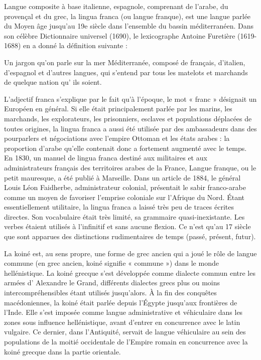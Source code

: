 Langue composite à base italienne, espagnole, comprenant de l’arabe, du provençal et du grec, la lingua franca (ou langue franque), est une langue parlée du Moyen âge jusqu’au 19e siècle dans l’ensemble du bassin méditerranéen. Dans son célèbre Dictionnaire universel (1690), le lexicographe Antoine Furetière (1619-1688) en a donné la définition suivante :


Un jargon qu’on parle sur la mer Méditerranée, composé de français, d’italien, d’espagnol et d’autres langues, qui s’entend par tous les matelots et marchands de quelque nation qu’ ils soient.


L’adjectif franca s’explique par le fait qu’à l’époque, le mot « franc » désignait un Européen en général. Si elle était principalement parlée par les marins, les marchands, les explorateurs, les prisonniers, esclaves et populations déplacées de toutes origines, la lingua franca a aussi été utilisée par des ambassadeurs dans des pourparlers et négociations avec l’empire Ottoman et les états arabes : la proportion d’arabe qu'elle contenait donc a fortement augmenté avec le temps. En 1830, un manuel de lingua franca destiné aux militaires et aux administrateurs français des territoires arabes de la France, Langue franque, ou le petit mauresque, a été publié à Marseille. Dans un article de 1884, le général Louis Léon Faidherbe, administrateur colonial, présentait le sabir franco-arabe comme un moyen de favoriser l’emprise coloniale sur l’Afrique du Nord. Étant essentiellement utilitaire, la lingua franca a laissé très peu de traces écrites directes. Son vocabulaire était très limité, sa grammaire quasi-inexistante. Les verbes étaient utilisés à l’infinitif et sans aucune flexion. Ce n’est qu’au 17 siècle que sont apparues des distinctions rudimentaires de temps (passé, présent, futur).



La koiné est, au sens propre, une forme de grec ancien qui a joué le rôle de langue commune (en grec ancien, koiné signifie « commune ») dans le monde hellénistique. La koiné grecque s’est développée comme dialecte commun entre les armées d’ Alexandre le Grand, différents dialectes grecs plus ou moins intercompréhensibles étant utilisés jusqu’alors. À la fin des conquêtes macédoniennes, la koiné était parlée depuis l’Égypte jusqu’aux frontières de l’Inde. Elle s’est imposée comme langue administrative et véhiculaire dans les zones sous influence hellénistique, avant d’entrer en concurrence avec le latin vulgaire. Ce dernier, dans l’Antiquité, servait de langue véhiculaire au sein des populations de la moitié occidentale de l’Empire romain en concurrence avec la koiné grecque dans la partie orientale.


